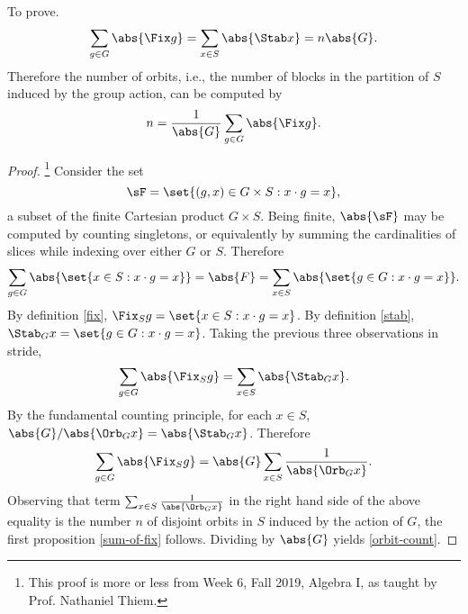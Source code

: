 \documentclass[onesided]{ccg-pset}
\begin{document}
\begin{enumerate}
    To prove. 
    \begin{equation}
        \label{sum-of-fix}
        \sum_{g \in G} \abs{\Fix g} = \sum_{x \in S} \abs{\Stab x} = n \abs{G}.
    \end{equation}
        Therefore the number of orbits, i.e., the number of blocks in the partition of $S$ induced by the group action, can be computed by
    \begin{equation}
        \label{orbit-count}
        n = \frac{1}{\abs{G}} \sum_{g \in G} \abs{\Fix g}.
    \end{equation}
 
    \begin{proof}
            \footnote{%
            This proof is more or less from Week 6, Fall 2019, Algebra I, as taught by Prof. Nathaniel Thiem.
            } Consider the set \begin{equation}\sF = \set{(g,x) \in G \times S : x \cdot g = x},\end{equation} a subset of the finite Cartesian product $G \times S$. 
            Being finite, $\abs{\sF}$ may be computed by counting singletons, or equivalently by summing the cardinalities of slices while indexing over either $G$ or $S$. 
        Therefore
        \begin{equation}
            \sum_{g \in G} \abs{\set{x \in S: x \cdot g = x}} = \abs{F} = \sum_{x \in S} \abs{\set{g \in G: x \cdot g = x}}.
        \end{equation}
        By definition \eqref{fix}, $\Fix_S g = \set{x \in S: x \cdot g = x}$. 
        By definition \eqref{stab}, $\Stab_G x = \set{g \in G: x \cdot g = x}$. 
        Taking the previous three observations in stride,
        \begin{equation*}
            \sum_{g \in G} \abs{\Fix_S g} = \sum_{x \in S}\abs{\Stab_G x}.
        \end{equation*}
        By the fundamental counting principle, for each $x \in S$, $\abs{G}/\abs{\Orb_G x} = \abs{\Stab_G x}$. 
        Therefore
        \begin{equation*}
            \sum_{g \in G} \abs{\Fix_S g} = \abs{G}\sum_{x \in S} \frac{1}{\abs{\Orb_G x}}.
        \end{equation*}
        Observing that term $\sum_{x \in S} \frac{1}{\abs{\Orb_G x}}$ in the right hand side of the above equality is the number $n$ of disjoint orbits in $S$ induced by the action of $G$, the first proposition \eqref{sum-of-fix} follows. Dividing by $\abs{G}$ yields \eqref{orbit-count}.
    \end{proof}


\end{enumerate}
\end{document}

